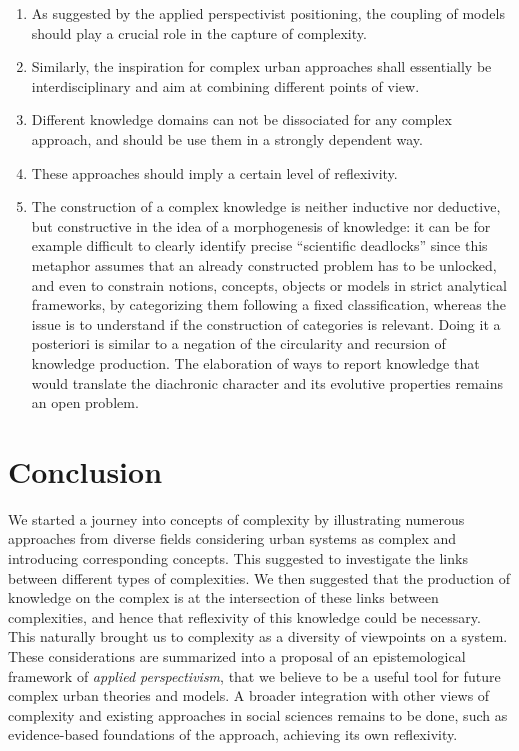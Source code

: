 \begin{enumerate}
	\item As suggested by the applied perspectivist positioning, the coupling of models should play a crucial role in the capture of complexity.
	\item Similarly, the inspiration for complex urban approaches shall essentially be interdisciplinary and aim at combining different points of view.
	\item Different knowledge domains can not be dissociated for any complex approach, and should be use them in a strongly dependent way.
	\item These approaches should imply a certain level of reflexivity.
	\item The construction of a complex knowledge \cite{morin1991methode} is neither inductive nor deductive, but constructive in the idea of a morphogenesis of knowledge: it can be for example difficult to clearly identify precise ``scientific deadlocks'' since this metaphor assumes that an already constructed problem has to be unlocked, and even to constrain notions, concepts, objects or models in strict analytical frameworks, by categorizing them following a fixed classification, whereas the issue is to understand if the construction of categories is relevant. Doing it a posteriori is similar to a negation of the circularity and recursion of knowledge production. The elaboration of ways to report knowledge that would translate the diachronic character and its evolutive properties remains an open problem.
\end{enumerate}




\section*{Conclusion}

We started a journey into concepts of complexity by illustrating numerous approaches from diverse fields considering urban systems as complex and introducing corresponding concepts. This suggested to investigate the links between different types of complexities. We then suggested that the production of knowledge on the complex is at the intersection of these links between complexities, and hence that reflexivity of this knowledge could be necessary. This naturally brought us to complexity as a diversity of viewpoints on a system. These considerations are summarized into a proposal of an epistemological framework of \emph{applied perspectivism}, that we believe to be a useful tool for future complex urban theories and models. A broader integration with other views of complexity and existing approaches in social sciences remains to be done, such as evidence-based foundations of the approach, achieving its own reflexivity.






